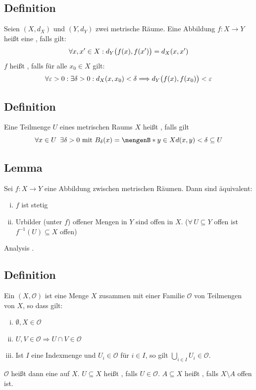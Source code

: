 \subsection[Definition: Isometrie und Stetigkeit]{Definition} %
\label{sub:15}
Seien $(X,d_X)$ und $(Y,d_Y)$ zwei metrische Räume. Eine Abbildung $f : X \to Y$ heißt eine , falls gilt:
\[
	\forall x,x' \in X : d_Y \enbrace[\big]{f(x), f(x')} = d_X (x,x')
\]
$f$ heißt , falls für alle $x_0 \in X$ gilt:
\[
	\forall \varepsilon >0 : \exists \delta >0 : d_X(x,x_0) < \delta  \Longrightarrow d_Y \enbrace[\big]{f(x), f(x_0)} < \varepsilon 
\] 

\subsection[Definition: Offenheit in einem metrischen Raum]{Definition} %
\label{sub:16}
Eine Teilmenge $U$ eines metrischen Raums $X$ heißt , falls gilt 
\[
	\forall x \in U \enspace \exists \delta  > 0 \text{ mit } B_\delta (x) = \set[y \in X]{d(x,y) < \delta } \subseteq U   
\]

\subsection[Lemma: Charakterisierung von Stetigkeit über offene Mengen]{Lemma} %
\label{sub:17}
Sei $f : X \to Y$  eine Abbildung zwischen metrischen Räumen. Dann sind äquivalent:
\begin{enumerate}[(i)]
	\item $f$ ist stetig
	\item Urbilder (unter $f$) offener Mengen in $Y$ sind offen in $X$. ($\forall \, U \subseteq Y$ offen ist $f ^{-1}(U) \subseteq X$ offen)
\end{enumerate}
Analysis . \bewende

\subsection[Definition: Topologischer Raum]{Definition} %
\label{sub:18}
Ein  $(X, \mathcal{O})$ ist eine Menge $X$ zusammen mit einer Familie $\mathcal{O}$ von Teilmengen von $X$, so dass gilt:
\begin{enumerate}[(i)]
	\item $\emptyset, X \in \mathcal{O}$
	\item $U,V \in \mathcal{O} \Longrightarrow U \cap V \in \mathcal{O}$
	\item Ist $I$ eine Indexmenge und $U_i \in \mathcal{O}$ für $i \in I$, so gilt $\bigcup_{i \in I} U_i \in \mathcal{O}$.
\end{enumerate} 
$\mathcal{O}$ heißt dann eine  auf $X$. $U \subseteq X$ heißt , falls $U \in \mathcal{O}$. $A \subseteq X$ heißt ,
falls $X \setminus A$ offen ist.  

